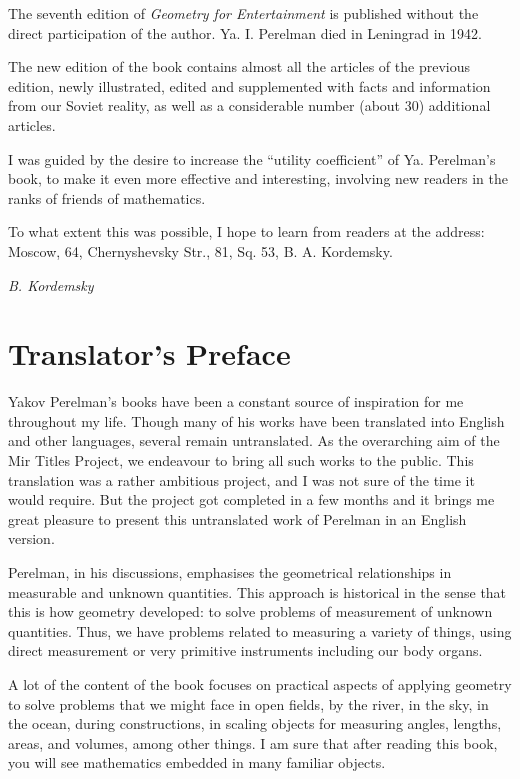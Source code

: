 The seventh edition of \emph{Geometry for Entertainment} is published without the direct participation of the author. Ya. I. Perelman died in Leningrad in 1942.

The new edition of the book contains almost all the articles of the previous edition, newly illustrated, edited and supplemented with facts and information from our Soviet reality, as well as a considerable number (about 30) additional articles.

I was guided by the desire to increase the ``utility coefficient'' of Ya. Perelman's book, to make it even more effective and interesting, involving new readers in the ranks of friends of mathematics.

To what extent this was possible, I hope to learn from readers at the address: Moscow, 64, Chernyshevsky Str., 81, Sq. 53, B. A. Kordemsky.


\begin{flushright}
\emph{B. Kordemsky}
\end{flushright}


\chapter{Translator's Preface}
\label{translator-preface}


Yakov Perelman's books have been a constant source of inspiration for me throughout my life. Though many of his works have been translated into English and other languages, several remain untranslated. As the overarching aim of the Mir Titles Project, we endeavour to bring all such works to the public. This translation was a rather ambitious project, and I was not sure of the time it would require. But the project got completed in a few months and it brings me great pleasure to present this untranslated work of Perelman in an English version.


Perelman, in his discussions, emphasises the geometrical relationships in measurable and unknown quantities. This approach is historical in the sense that this is how geometry developed: to solve problems of measurement of unknown quantities. Thus, we have problems related to measuring a variety of things, using direct measurement or very primitive instruments including our body organs.

A lot of the content of the book focuses on practical aspects of applying geometry to solve problems that we might face in open fields, by the river, in the sky, in the ocean, during constructions, in scaling objects for measuring angles, lengths, areas, and volumes, among other things. I am sure that after reading this book, you will see mathematics embedded in many familiar objects. 



